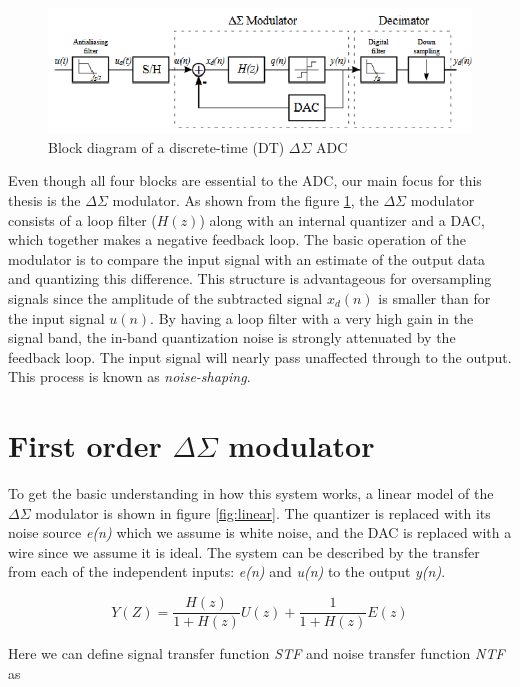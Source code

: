 \begin{figure}[h]
\centering
\includegraphics[scale=0.75]{images/delta_sigma_block.png}
\caption{Block diagram of a discrete-time (DT) $\Delta\Sigma$ ADC\cite{deltapic}}
\label{fig:delta_block}
\end{figure}

Even though all four blocks are essential to the ADC, our main focus for this thesis is the $\Delta\Sigma$ modulator. As shown from the figure \ref{fig:delta_block}, the $\Delta\Sigma$ modulator consists of a loop filter ($H(z)$) along with an internal quantizer and a DAC, which together makes a negative feedback loop. The basic operation of the modulator is to compare the input signal with an estimate of the output data and quantizing this difference. This structure is advantageous for oversampling signals since the amplitude of the subtracted signal $x_d(n)$ is smaller than for the input signal $u(n)$. By having a loop filter with a very high gain in the signal band, the in-band quantization noise is strongly attenuated by the feedback loop. The input signal will nearly pass unaffected through to the output. This process is known as \textit{noise-shaping}.

\section{First order $\Delta\Sigma$ modulator}\label{first_order}
To get the basic understanding in how this system works, a linear model of the $\Delta\Sigma$ modulator is shown in figure \ref{fig:linear}. The quantizer is replaced with its noise source \textit{e(n)} which we assume is white noise, and the DAC is replaced with a wire since we assume it is ideal. The system can be described by the transfer from each of the independent inputs: \textit{e(n)} and \textit{u(n)} to the output \textit{y(n)}. 

\begin{equation}
    Y(Z) = \frac{H(z)}{1+H(z)}U(z) + \frac{1}{1+H(z)}E(z)
\end{equation}

Here we can define signal transfer function \textit{STF} and noise transfer function \textit{NTF} as

